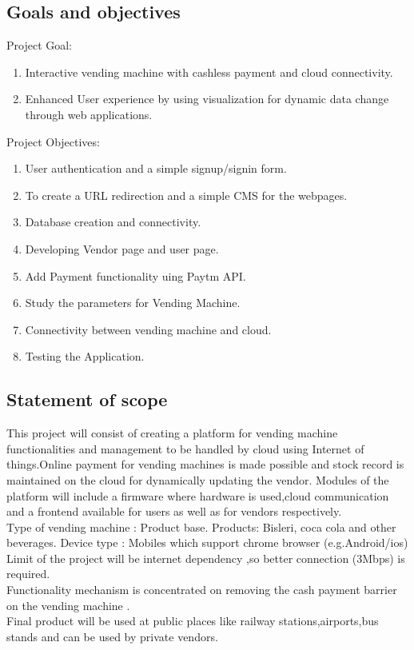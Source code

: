 \documentclass[oneside,a4paper,12pt]{report}
\begin{document}
\subsection{Goals and objectives}  
Project Goal:
\begin{enumerate}
\item Interactive vending machine with cashless payment and cloud
connectivity.
\item Enhanced User experience by using visualization for dynamic data
change through web applications.
\end{enumerate}	
Project Objectives:
\begin{enumerate}
\item User authentication and a simple signup/signin form.
\item To create a URL redirection and a simple CMS for the webpages. 
\item Database creation and connectivity.
\item Developing  Vendor page and user page.
\item Add Payment functionality uing Paytm API.
\item Study the parameters for Vending Machine.
\item Connectivity between vending machine and cloud.
\item Testing the Application. 
\end{enumerate}	

 \subsection{Statement of scope} 
This project will consist of creating a platform for vending machine functionalities and management to be  handled by cloud using Internet of things.Online payment for vending machines is made possible and stock record is maintained on the cloud for dynamically updating the vendor. Modules of the platform will include a firmware where hardware is used,cloud communication and a frontend available for users as well as for vendors respectively.\\
Type of vending machine : Product base.
Products: Bisleri,  coca cola and other beverages.
Device type : Mobiles which support chrome browser (e.g.Android/ios)\\
Limit of the project will be internet dependency ,so better connection (3Mbps) is required.\\
Functionality mechanism is concentrated on removing the cash payment barrier on the vending machine .\\
Final product will be used at public places like railway stations,airports,bus stands and can be used by private vendors.\\
\end{document}
